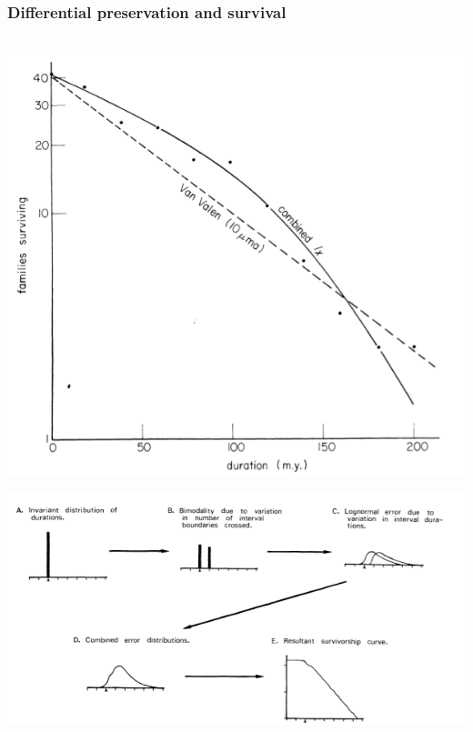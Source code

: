 \documentclass{beamer}
\begin{document}
\begin{frame}
  \frametitle{Differential preservation and survival}

  \begin{columns}
    \begin{column}{0.5\textwidth}
      \begin{center}
        \includegraphics[height = 0.4\textheight, width = \textwidth, keepaspectratio = true]{figure/raup}

        \tiny{}

        \includegraphics[height = 0.4\textheight, width = \textwidth, keepaspectratio = true]{figure/sepkoski}


\end{center}
\end{column}
\end{columns}
\end{frame}
\end{document}
